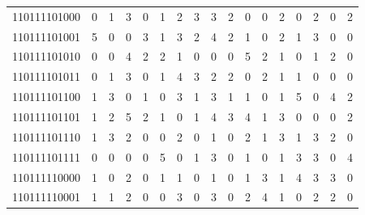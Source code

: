 \documentclass[10pt,a4paper]{article}
\begin{document}
\begin{longtable}{ |c|c|c|c|c|c|c|c|c|c|c|c|c|c|c|c|c| }
    110111101000              & 0                            & 1                                & 3                            & 0                              & 1   & 2   & 3   & 3   & 2   & 0   & 0   & 2   & 0   & 2   & 0   & 2   \\
    110111101001              & 5                            & 0                                & 0                            & 3                              & 1   & 3   & 2   & 4   & 2   & 1   & 0   & 2   & 1   & 3   & 0   & 0   \\
    110111101010              & 0                            & 0                                & 4                            & 2                              & 2   & 1   & 0   & 0   & 0   & 5   & 2   & 1   & 0   & 1   & 2   & 0   \\
    110111101011              & 0                            & 1                                & 3                            & 0                              & 1   & 4   & 3   & 2   & 2   & 0   & 2   & 1   & 1   & 0   & 0   & 0   \\
    110111101100              & 1                            & 3                                & 0                            & 1                              & 0   & 3   & 1   & 3   & 1   & 1   & 0   & 1   & 5   & 0   & 4   & 2   \\
    110111101101              & 1                            & 2                                & 5                            & 2                              & 1   & 0   & 1   & 4   & 3   & 4   & 1   & 3   & 0   & 0   & 0   & 2   \\
    110111101110              & 1                            & 3                                & 2                            & 0                              & 0   & 2   & 0   & 1   & 0   & 2   & 1   & 3   & 1   & 3   & 2   & 0   \\
    110111101111              & 0                            & 0                                & 0                            & 0                              & 5   & 0   & 1   & 3   & 0   & 1   & 0   & 1   & 3   & 3   & 0   & 4   \\
    110111110000              & 1                            & 0                                & 2                            & 0                              & 1   & 1   & 0   & 1   & 0   & 1   & 3   & 1   & 4   & 3   & 3   & 0   \\
    110111110001              & 1                            & 1                                & 2                            & 0                              & 0   & 3   & 0   & 3   & 0   & 2   & 4   & 1   & 0   & 2   & 2   & 0   \\

\end{longtable}
\end{document}
